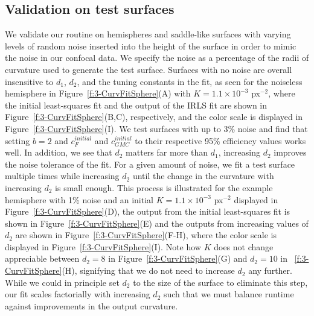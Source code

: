 \subsection{Validation on test surfaces}
We validate our routine on hemispheres and saddle-like surfaces with varying levels of random noise inserted into the height of the surface in order to mimic the noise in our confocal data.
We specify the noise as a percentage of the radii of curvature used to generate the test surface.
Surfaces with no noise are overall insensitive to $d_1$, $d_2$, and the tuning constants in the fit, as seen for the noiseless hemisphere in Figure~\ref{f:3-CurvFitSphere}(A) with $K = 1.1 \times 10^{-3}$ px$^{-2}$, where the initial least-squares fit and the output of the IRLS fit are shown in Figure~\ref{f:3-CurvFitSphere}(B,C), respectively, and the color scale is displayed in Figure~\ref{f:3-CurvFitSphere}(I).
We test surfaces with up to 3\% noise and find that setting $b=2$ and $c_{F}^{initial}$ and $c_{GMC}^{initial}$ to their respective 95\% efficiency values works well.
In addition, we see that $d_2$ matters far more than $d_1$, increasing $d_2$ improves the noise tolerance of the fit.
For a given amount of noise, we fit a test surface multiple times while increasing $d_2$ until the change in the curvature with increasing $d_2$ is small enough.
This process is illustrated for the example hemisphere with 1\% noise and an initial $K =1.1 \times 10^{-3}$ px$^{-2}$ displayed in Figure~\ref{f:3-CurvFitSphere}(D), the output from the initial least-squares fit is shown in Figure~\ref{f:3-CurvFitSphere}(E) and the outputs from increasing values of $d_2$ are shown in Figure~\ref{f:3-CurvFitSphere}(F-H), where the color scale is displayed in Figure~\ref{f:3-CurvFitSphere}(I).
Note how $K$ does not change appreciable between $d_2 = 8$ in Figure~\ref{f:3-CurvFitSphere}(G) and $d_2 = 10$ in ~\ref{f:3-CurvFitSphere}(H), signifying that we do not need to increase $d_2$ any further.
While we could in principle set $d_2$ to the size of the surface to eliminate this step, our fit scales factorially with increasing $d_2$ such that we must balance runtime against improvements in the output curvature.
